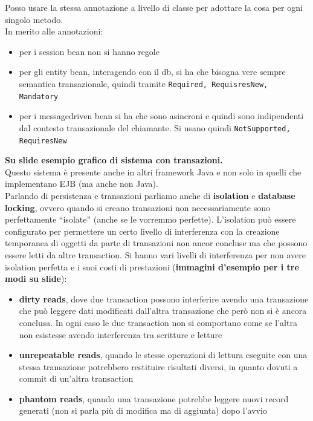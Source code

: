 \documentclass[a4paper,12pt, oneside]{book}
\begin{document}
\begin{enumerate}
\begin{itemize}
  \end{itemize}
  Posso usare la stessa annotazione a livello di classe per adottare la cosa per
  ogni singolo metodo.\\
  In merito alle annotazioni:
  \begin{itemize}
    \item per i session bean non si hanno regole
    \item per gli entity bean, interagendo con il db, si ha che bisogna vere
    sempre semantica transazionale, quindi tramite \texttt{Required,
      RequisresNew, Mandatory}
    \item per i messagedriven bean si ha che sono asincroni e quindi sono
    indipendenti dal contesto transazionale del chiamante. Si usano quindi
    \texttt{NotSupported, RequiresNew}
  \end{itemize}
  \textbf{Su slide esempio grafico di sistema con transazioni.}\\
  Questo sistema è presente anche in altri framework Java e non solo in quelli
  che implementano EJB (ma anche non Java).\\
  Parlando di persistenza e transazioni parliamo anche di \textbf{isolation} e
  \textbf{database  locking}, ovvero quando si creano transazioni non
  necessariamente sono perfettamente ``isolate'' (anche se le vorremmo
  perfette). L'isolation può
  essere configurato per permettere un certo livello di interferenza con la
  creazione temporanea di oggetti da parte di transazioni non ancor concluse ma
  che possono essere letti da altre transaction. Si hanno vari livelli di
  interferenza per non avere isolation perfetta e i suoi costi di prestazioni
  (\textbf{immagini d'esempio per i tre modi su slide}):
  \begin{itemize}
    \item \textbf{dirty reads}, dove due transaction possono interferire avendo
    una transazione che può leggere dati modificati dall'altra transazione che
    però non si è ancora conclusa. In ogni caso le due transaction non si
    comportano come se l'altra non esistesse avendo interferenza tra scritture e
    letture 
    \item \textbf{unrepeatable reads}, quando le stesse operazioni di lettura
    eseguite con una stessa transazione potrebbero restituire risultati
    diversi, in quanto dovuti a commit di un'altra transaction
    \item \textbf{phantom reads}, quando una transazione potrebbe leggere nuovi
    record generati (non si parla più di modifica ma di aggiunta) dopo l'avvio

\end{itemize}
\end{enumerate}
\end{document}
